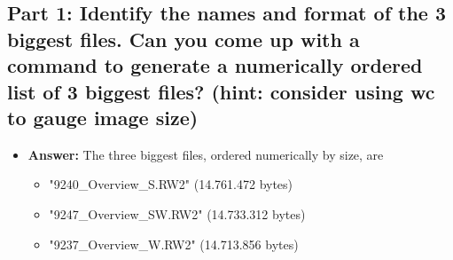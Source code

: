 \documentclass{article}
\begin{document}
\subsection{Part 1: Identify the names and format of the 3 biggest files. Can you come up with a command to generate a numerically ordered list of 3 biggest files? (hint: consider using wc to gauge image size)}
\begin{itemize}
    \item \textbf{Answer:} The three biggest files, ordered numerically by size, are
    \begin{itemize}
        \item "9240\_Overview\_S.RW2" (14.761.472 bytes)
        \item "9247\_Overview\_SW.RW2" (14.733.312 bytes)
        \item  "9237\_Overview\_W.RW2" (14.713.856 bytes)
    \end{itemize} 

\end{itemize}
\end{document}
